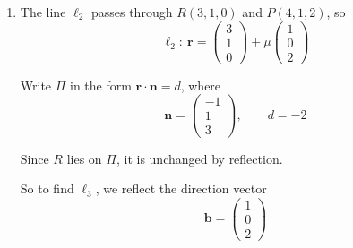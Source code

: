 \documentclass[leqno]{article}
\begin{document}
\begin{enumerate}[
  label=\textbf{\arabic*.},
  leftmargin=*,
  topsep=0pt,
  partopsep=0pt,
  parsep=0pt
]
\begin{djsSolution}
\begin{enumerate}[label=\textbf{(\alph*)}]
Hence we may take the normal vector as
\[
\begin{pmatrix}2\\5\\-1\end{pmatrix}
\]

Using the point \(P(4,1,2)\), the plane equation is
\[
\begin{pmatrix}2\\5\\-1\end{pmatrix}\cdot
\left(
\begin{pmatrix}x\\y\\z\end{pmatrix}
-
\begin{pmatrix}4\\1\\2\end{pmatrix}
\right)=0
\]

So
\begin{align*}
2(x-4)+5(y-1)-(z-2)&=0\\
2x-8+5y-5-z+2&=0\\
2x+5y-z&=11
\end{align*}

  \item The line \(\ell_2\) passes through \(R(3,1,0)\) and \(P(4,1,2)\), so
\[
\ell_2:\ \mathbf r=
\begin{pmatrix}3\\1\\0\end{pmatrix}
+\mu
\begin{pmatrix}1\\0\\2\end{pmatrix}
\]

Write \(\Pi\) in the form \(\mathbf r\cdot\mathbf n=d\), where
\[
\mathbf n=\begin{pmatrix}-1\\1\\3\end{pmatrix},
\qquad
d=-2
\]

Since \(R\) lies on \(\Pi\), it is unchanged by reflection.

So to find \(\ell_3\), we reflect the direction vector
\[
\mathbf b=\begin{pmatrix}1\\0\\2\end{pmatrix}
\]


\end{enumerate}
\end{djsSolution}
\end{enumerate}
\end{document}
